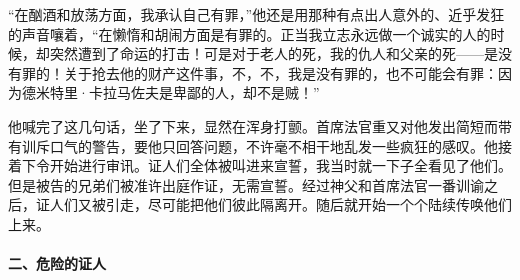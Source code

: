 \par “在酗酒和放荡方面，我承认自己有罪，”他还是用那种有点出人意外的、近乎发狂的声音嚷着，“在懒惰和胡闹方面是有罪的。正当我立志永远做一个诚实的人的时候，却突然遭到了命运的打击！可是对于老人的死，我的仇人和父亲的死——是没有罪的！关于抢去他的财产这件事，不，不，我是没有罪的，也不可能会有罪：因为德米特里·卡拉马佐夫是卑鄙的人，却不是贼！”
\par 他喊完了这几句话，坐了下来，显然在浑身打颤。首席法官重又对他发出简短而带有训斥口气的警告，要他只回答问题，不许毫不相干地乱发一些疯狂的感叹。他接着下令开始进行审讯。证人们全体被叫进来宣誓，我当时就一下子全看见了他们。但是被告的兄弟们被准许出庭作证，无需宣誓。经过神父和首席法官一番训谕之后，证人们又被引走，尽可能把他们彼此隔离开。随后就开始一个个陆续传唤他们上来。
\paragraph*{二、危险的证人}

